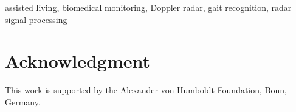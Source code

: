 \documentclass[journal]{IEEEtran}
\begin{document}
\begin{IEEEkeywords}
assisted living, biomedical monitoring, Doppler radar, gait recognition, radar signal processing
\end{IEEEkeywords}

\IEEEpeerreviewmaketitle




\section*{Acknowledgment}
This work is supported by the Alexander von Humboldt Foundation, Bonn, Germany.




\end{document}
